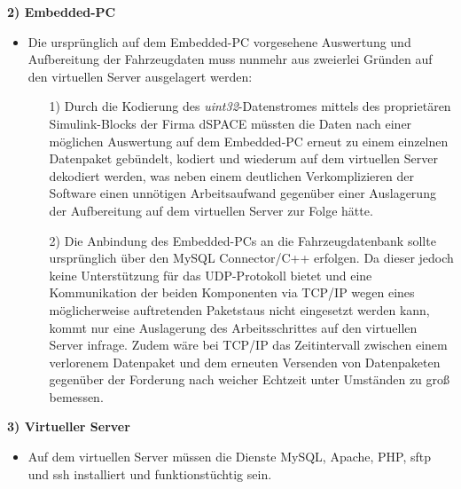 \documentclass[fontsize = 12pt, paper = a4]{scrreprt}
\begin{document}
\textbf{2) Embedded-PC}

\begin{itemize}

\item Die ursprünglich auf dem Embedded-PC vorgesehene Auswertung und Aufbereitung der Fahrzeugdaten muss nunmehr aus zweierlei Gründen auf den virtuellen Server ausgelagert werden: \\

\begin{itemize}

\item[1)] Durch die Kodierung des \textit{uint32}-Datenstromes mittels des proprietären Simulink-Blocks der Firma dSPACE müssten die Daten nach einer möglichen Auswertung auf dem Embedded-PC erneut zu einem einzelnen Datenpaket gebündelt, kodiert und wiederum auf dem virtuellen Server dekodiert werden, was neben einem deutlichen Verkomplizieren der Software einen unnötigen Arbeitsaufwand gegenüber einer Auslagerung der Aufbereitung auf dem virtuellen Server zur Folge hätte. \\

\item[2)] Die Anbindung des Embedded-PCs an die Fahrzeugdatenbank sollte ursprünglich über den MySQL Connector/C++ erfolgen. Da dieser jedoch keine Unterstützung für das UDP-Protokoll bietet und eine Kommunikation der beiden Komponenten via TCP/IP wegen eines möglicherweise auftretenden Paketstaus nicht eingesetzt werden kann, kommt nur eine Auslagerung des Arbeitsschrittes auf den virtuellen Server infrage. Zudem wäre bei TCP/IP  das Zeitintervall zwischen einem verlorenem Datenpaket und dem erneuten Versenden von Datenpaketen gegenüber der Forderung nach weicher Echtzeit unter Umständen zu groß bemessen. \\

\end{itemize}

\end{itemize}

\newpage

\textbf{3) Virtueller Server}

\begin{itemize}

\item Auf dem virtuellen Server müssen die Dienste MySQL, Apache, PHP, sftp und ssh installiert und funktionstüchtig sein.  

\end{itemize}
\end{document}
